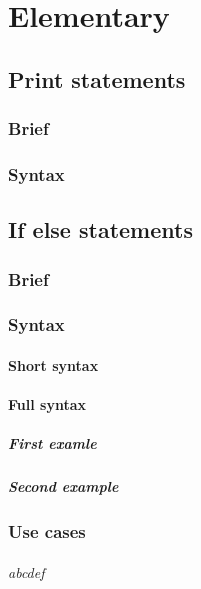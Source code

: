 \documentclass[12pt, a4paper]{book}
\begin{document}
\part{Elementary}



\chapter{Print statements}
\section{Brief}
\Blindtext[2][2]
\section{Syntax}
\Blindtext[2][2]



\chapter{If else statements}
\section{Brief}
\Blindtext[2][1]

\section{Syntax}
\subsection{Short syntax}
\Blindtext[2][1]
\subsection{Full syntax}
\blindtext
\subsubsection{First examle}
\blindtext
\subsubsection{Second example}
\blindtext


\section{Use cases}
\paragraph{abcdef
    \blindtext
}
\end{document}
